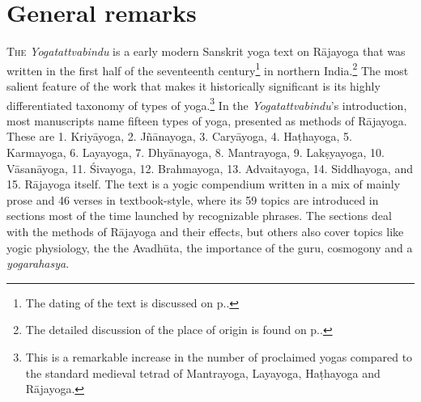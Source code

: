\section{General remarks}
\label{generalremarks}
\lettrine[lines=2, lhang=0.2, loversize=0.25]{T}{he} \textit{Yogatattvabindu} is a early modern Sanskrit yoga text on Rājayoga that was written in the first half of the seventeenth century\footnote{The dating of the text is discussed on p.\pageref{dating}.} in northern India.\footnote{The detailed discussion of the place of origin is found on p.\pageref{placeoforigin}.} The most salient feature of the work that makes it historically significant is its highly differentiated taxonomy of types of yoga.\footnote{This is a remarkable increase in the number of proclaimed yogas compared to the standard medieval tetrad of Mantrayoga, Layayoga, Haṭhayoga and Rājayoga.} In the \textit{Yogatattvabindu}'s introduction, most manuscripts name fifteen types of yoga, presented as methods of Rājayoga. These are 1. Kriyāyoga, 2. Jñānayoga, 3. Caryāyoga, 4. Haṭhayoga, 5. Karmayoga, 6. Layayoga, 7. Dhyānayoga, 8. Mantrayoga, 9. Lakṣyayoga, 10. Vāsanāyoga, 11. Śivayoga, 12. Brahmayoga, 13. Advaitayoga, 14. Siddhayoga, and 15. Rājayoga itself. The text is a yogic compendium written in a mix of mainly prose and 46 verses in textbook-style, where its 59 topics are introduced in sections most of the time launched by recognizable phrases. The sections deal with the methods of Rājayoga and their effects, but others also cover topics like yogic physiology, the the Avadhūta, the importance of the guru, cosmogony and a \textit{yogarahasya}.  


